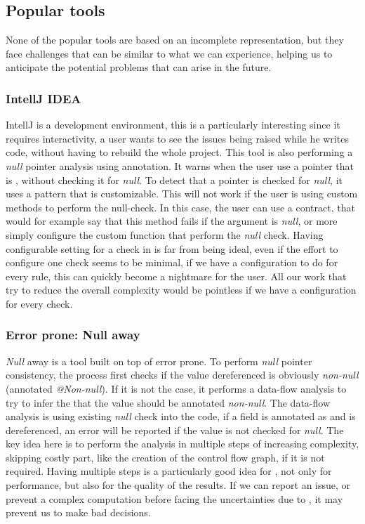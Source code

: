 \subsection{Popular tools}
\label{subsec:other_tools_features}

None of the popular tools are based on an incomplete representation, but they face challenges that can be similar to what we can experience, helping us to anticipate the potential problems that can arise in the future.

\subsubsection{IntellJ IDEA}
\label{subsubsec:intellj_idea}

IntellJ is a development environment, this is a particularly interesting since it requires interactivity, a user wants to see the issues being raised while he writes code, without having to rebuild the whole project. 
This tool is also performing a \emph{null} pointer analysis using annotation. 
It warns when the user use a pointer that is \nullable{}, without checking it for \emph{null}. 
To detect that a pointer is checked for \emph{null}, it uses a pattern that is customizable. 
This will not work if the user is using custom methods to perform the null-check. 
In this case, the user can use a contract, that would for example say that this method fails if the argument is \emph{null}, or more simply configure the custom function that perform the \emph{null} check.\newline
Having configurable setting for a check in \slang{} is far from being ideal, even if the effort to configure one check seems to be minimal, if we have a configuration to do for every rule, this can quickly become a nightmare for the user. 
All our work that try to reduce the overall complexity would be pointless if we have a configuration for every check.


\subsubsection{Error prone: Null away}
\label{subsubsec:error_prone}

\emph{Null} away is a tool built on top of error prone. 
To perform \emph{null} pointer consistency, the process first checks if the value dereferenced is obviously \emph{non-null} (annotated \emph{@Non-null}). 
If it is not the case, it performs a data-flow analysis to try to infer the that the value should be annotated \emph{non-null}. 
The data-flow analysis is using existing \emph{null} check into the code, if a field is annotated as \nullable{} and is dereferenced, an error will be reported if the value is not checked for \emph{null}. \newline
The key idea here is to perform the analysis in multiple steps of increasing complexity, skipping costly part, like the creation of the control flow graph, if it is not required.
Having multiple steps is a particularly good idea for \slang{}, not only for performance, but also for the quality of the results. 
If we can report an issue, or prevent a complex computation before facing the uncertainties due to \slang{}, it may prevent us to make bad decisions.

